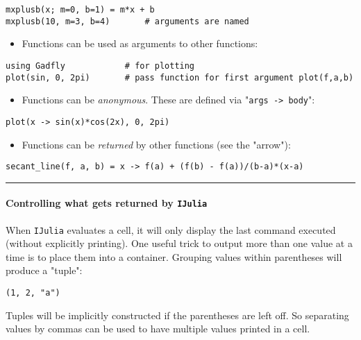 \documentclass[12pt]{article}
\begin{document}
\begin{verbatim}
mxplusb(x; m=0, b=1) = m*x + b
mxplusb(10, m=3, b=4)       # arguments are named
\end{verbatim}
\begin{itemize}
\itemsep1pt\parskip0pt
\item
  Functions can be used as arguments to other functions:
\end{itemize}



\begin{verbatim}
using Gadfly            # for plotting
plot(sin, 0, 2pi)       # pass function for first argument plot(f,a,b)
\end{verbatim}
\begin{itemize}
\itemsep1pt\parskip0pt
\item
  Functions can be \emph{anonymous}. These are defined via
  "\texttt{args -\textgreater{} body}":
\end{itemize}



\begin{verbatim}
plot(x -> sin(x)*cos(2x), 0, 2pi)
\end{verbatim}
\begin{itemize}
\itemsep1pt\parskip0pt
\item
  Functions can be \emph{returned} by other functions (see the "arrow"):
\end{itemize}



\begin{verbatim}
secant_line(f, a, b) = x -> f(a) + (f(b) - f(a))/(b-a)*(x-a)
\end{verbatim}
\begin{center}\rule{3in}{0.4pt}\end{center}

\paragraph{Controlling what gets returned by \texttt{IJulia}}

When \texttt{IJulia} evaluates a cell, it will only display the last
command executed (without explicitly printing). One useful trick to
output more than one value at a time is to place them into a container.
Grouping values within parentheses will produce a "tuple":



\begin{verbatim}
(1, 2, "a")
\end{verbatim}
Tuples will be implicitly constructed if the parentheses are left off.
So separating values by commas can be used to have multiple values
printed in a cell.
\end{document}
